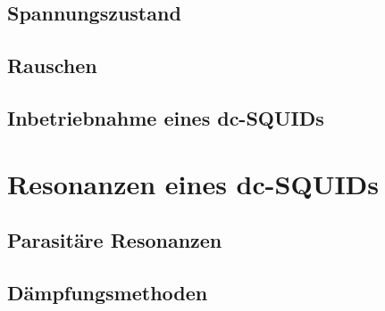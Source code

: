 \blindtext[3]

\subsection{Spannungszustand}

\subsection{Rauschen}

\subsection{Inbetriebnahme eines dc-SQUIDs}


\section{Resonanzen eines dc-SQUIDs}

\subsection{Parasitäre Resonanzen}

\subsection{Dämpfungsmethoden}


